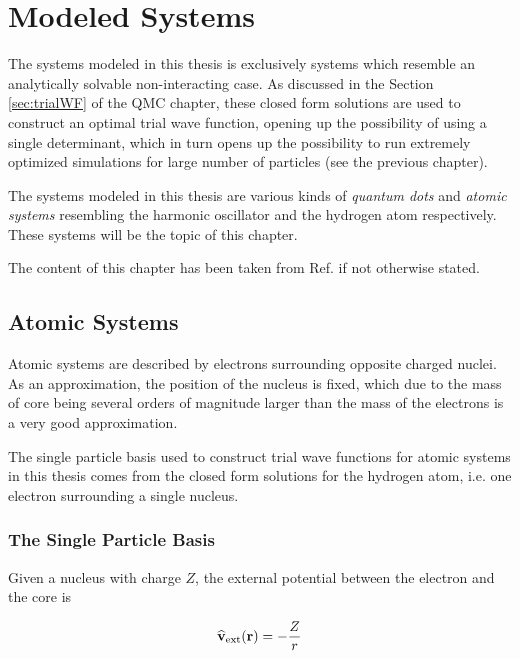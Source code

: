 \chapter{Modeled Systems}

The systems modeled in this thesis is exclusively systems which resemble an analytically solvable non-interacting case. As discussed in the Section \ref{sec:trialWF} of the QMC chapter, these closed form solutions are used to construct an optimal trial wave function, opening up the possibility of using a single determinant, which in turn opens up the possibility to run extremely optimized simulations for large number of particles (see the previous chapter). 

The systems modeled in this thesis are various kinds of \textit{quantum dots} and \textit{atomic systems} resembling the harmonic oscillator and the hydrogen atom respectively. These systems will be the topic of this chapter.

The content of this chapter has been taken from Ref. \cite{griffiths} if not otherwise stated.

\section{Atomic Systems}

Atomic systems are described by electrons surrounding opposite charged nuclei. As an approximation, the position of the nucleus is fixed, which due to the mass of core being several orders of magnitude larger than the mass of the electrons is a very good approximation. 

The single particle basis used to construct trial wave functions for atomic systems in this thesis comes from the closed form solutions for the hydrogen atom, i.e. one electron surrounding a single nucleus.

\subsection{The Single Particle Basis}

Given a nucleus with charge $Z$, the external potential between the electron and the core is

\begin{equation}
 {\bf\widehat{v}}_\mathrm{ext}(\mathbf{r}) = -\frac{Z}{r}  
\end{equation}

